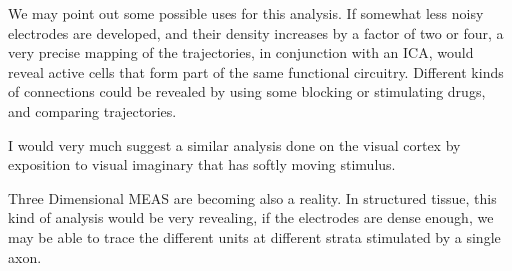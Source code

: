 \documentclass[11pt, letterpaper]{article}
\begin{document}
We may point out some possible uses for this analysis.
If somewhat less noisy electrodes are developed, and their density
increases by a factor of two or four, a very precise mapping of the
trajectories, in conjunction with an ICA, would reveal active
cells that form part of the same functional circuitry. Different
kinds of connections could be revealed by using some blocking
or stimulating drugs, and comparing trajectories.

I would very much suggest a similar analysis done on
the visual cortex by exposition to visual imaginary
that has softly moving stimulus.

Three Dimensional MEAS are becoming also a reality.
In structured tissue, this kind
of analysis would be very revealing, if the electrodes
are dense enough, we may be able to trace the different units at
different strata stimulated by a single axon.





 
\end{document}
